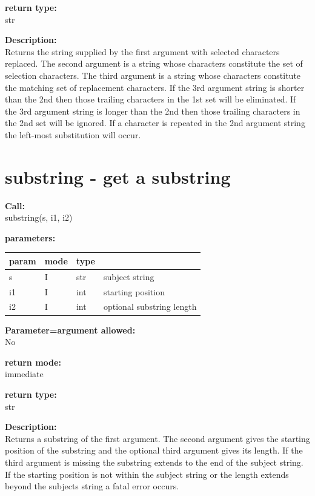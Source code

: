        {\bf return type:} \\
        str
        
        {\bf Description:} \\
        Returns the string supplied by the first argument with selected
        characters replaced. The second argument is a string whose
        characters constitute the set of selection characters. The third
        argument is a string  whose characters constitute the matching
        set of  replacement characters. If the 3rd argument string is
        shorter than the 2nd then those trailing characters in the 1st
        set will be eliminated. If the 3rd argument string is longer than
        the 2nd then those trailing characters in the 2nd set will be
        ignored. If a character is repeated in the 2nd argument string
        the left-most substitution will occur.                


    \section{substring - get a substring}\label{sec:ifsubstring}
        
        {\bf Call:} \\
        substring(s, i1, i2)
        
        {\bf parameters:} \\
        \begin{tabular}{| l | l | l | l |}
        \hline
        param  & mode & type & \\
        \hline \hline
        s  & I & str & subject string               \\ \hline
        i1 & I & int & starting position            \\ \hline
        i2 & I & int & optional substring length    \\ \hline
        \end{tabular}
        
        {\bf Parameter=argument allowed:} \\
        No
        
        {\bf return mode:} \\
        immediate

        {\bf return type:} \\
        str
        
        {\bf Description:} \\
        Returns a substring of the first argument. The second argument gives
        the starting position of the substring and the optional third argument
        gives its length. If the third argument is missing the substring
        extends to the end of the subject string. If the starting position is
        not within the subject string or the length extends beyond the subjects
        string a fatal error occurs.


